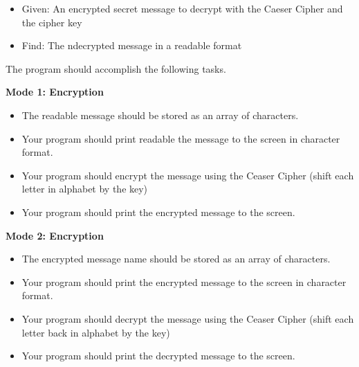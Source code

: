 \documentclass[12pt]{article}
\begin{document}
\begin{description}[labelindent=1cm]
\begin{itemize}
		\item Given: An encrypted secret message to decrypt with the Caeser Cipher and the cipher key
		
		\item Find: The ndecrypted message in a readable format
		
	\end{itemize}

\item[\textbf{\underline{Program Minimum Requirements:}}] \hfill \vspace{0mm}

The program should accomplish the following tasks. 

{\bf Mode 1: Encryption}
\begin{itemize}

	\item The readable message should be stored as an array of characters.

	\item Your program should print readable the message to the screen in character format.
	
	\item Your program should encrypt the message using the Ceaser Cipher (shift each letter in alphabet by the key)
	
	\item Your program should print the encrypted message to the screen.
	
\end{itemize}
	 
{\bf Mode 2: Encryption}
\begin{itemize}
	
	\item The encrypted message name should be stored as an array of characters.
	
	\item Your program should print the encrypted message to the screen in character format.
	
	\item Your program should decrypt the message using the Ceaser Cipher (shift each letter back in alphabet by the key)
	
	\item Your program should print the decrypted message to the screen.
	
\end{itemize}	
\newpage


\end{description}
\end{document}

